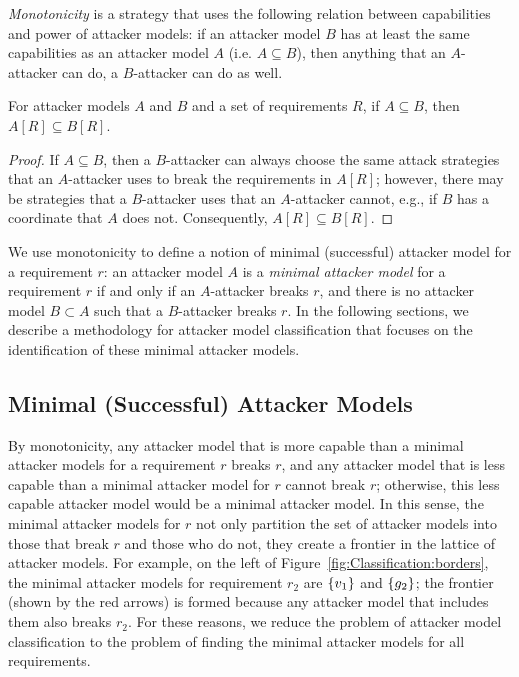 \emph{Monotonicity} is a strategy that uses the following relation between capabilities and power of attacker models: if an attacker model $B$ has at least the same capabilities as an attacker model $A$ (i.e. $A\subseteq B$), then anything that an $A$-attacker can do, a $B$-attacker can do as well.
\begin{proposition}[Monotonicity]
\label{theo:monotonicity}
For attacker models $A$ and $B$ and a set of requirements $R$, if $A\subseteq B$, then $A[R]\subseteq B[R]$.
\end{proposition}
\begin{proof}
If $A\subseteq B$, then a $B$-attacker can always choose the same attack strategies that an $A$-attacker uses to break the requirements in $A[R]$; however, there may be strategies that a $B$-attacker uses that an $A$-attacker cannot, e.g., if $B$ has a coordinate that $A$ does not. Consequently, $A[R]\subseteq B[R]$.
\end{proof}
We use monotonicity to define a notion of {minimal (successful) attacker model} for a requirement $r$: an attacker model $A$ is a \emph{minimal attacker model} for a requirement $r$ if and only if an $A$-attacker breaks $r$, and there is no attacker model $B\subset A$ such that a $B$-attacker breaks $r$. In the following sections, we describe a methodology for attacker model classification that focuses on the identification of these minimal attacker models. %

\subsection{Minimal (Successful) Attacker Models}
By monotonicity, any attacker model that is more capable than a minimal attacker models for a requirement $r$ breaks $r$, and any attacker model that is less capable than a minimal attacker model for $r$ cannot break $r$; otherwise, this less capable attacker model would be a minimal attacker model. In this sense, the minimal attacker models for $r$ not only partition the set of attacker models into those that break $r$ and those who do not, they create a frontier in the lattice of attacker models. For example, on the left of Figure~\ref{fig:Classification:borders}, the minimal attacker models for requirement $r_2$ are $\left\{v_1\right\}$ and $\left\{g_2\right\}$; the frontier (shown by the red arrows) is formed because any attacker model that includes them also breaks $r_2$. For these reasons, we reduce the problem of attacker model classification to the problem of finding the minimal attacker models for all requirements.

